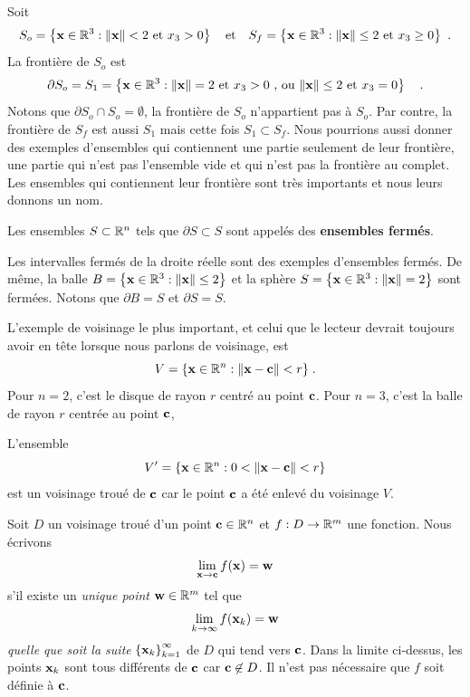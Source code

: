 {\begin{egg}[\theory]
Soit
\[
S_o = \left\{ \mathbf{x} \in \mathbb{R}^3 : \| \mathbf{x} \| < 2 \ \text{et} \
x_3> 0 \right\}
\quad \text{et} \quad
S_f = \left\{ \mathbf{x} \in \mathbb{R}^3 : \| \mathbf{x} \| \leq 2 \ \text{et}
\ x_3 \geq 0 \right\} \ .
\]
La frontière de $S_o$ est
\[
\partial S_o = S_1 = \left\{ \mathbf{x} \in \mathbb{R}^3 : \| \mathbf{x} \| = 2
\ \text{et} \ x_3 >0 \ \text{, ou}\ \|\mathbf{x}\| \leq 2
\ \text{et} \ x_3=0 \right\} \quad  .
\]
Notons que $\partial S_o \cap S_o = \emptyset$, la frontière de $S_o$
n'appartient pas à $S_o$.  Par contre, la frontière de $S_f$ est aussi
$S_1$ mais cette fois $S_1 \subset S_f$.  Nous pourrions aussi donner des
exemples d'ensembles qui contiennent une partie seulement de leur
frontière, une partie qui n'est pas l'ensemble vide et qui n'est pas
la frontière au complet.  Les ensembles qui contiennent leur frontière
sont très importants et nous leurs donnons un nom.
\end{egg}

\begin{defn}[+\theory]
Les ensembles $S \subset \mathbb{R}^n$ tels que $\partial S \subset S$ sont
appelés des {\bfseries ensembles fermés}\index{Ensemble fermé}.
\end{defn}

\begin{rmk}[\theory]
Les intervalles fermés de la droite réelle sont des exemples
d'ensembles fermés.  De même, la balle
$B = \left\{ \mathbf{x} \in \mathbb{R}^3 : \|\mathbf{x}\|\leq 2 \right\}$ et la
sphère $S = \left\{ \mathbf{x} \in \mathbb{R}^3 : \|\mathbf{x}\| =  2 \right\}$
sont fermées.  Notons que $\partial B = S$ et $\partial S = S$.
\end{rmk}

\begin{egg}
L'exemple de voisinage le plus important, et celui que le lecteur
devrait toujours avoir en tête lorsque nous parlons de voisinage, est
\[
V = \{ \mathbf{x} \in \mathbb{R}^n : \|\mathbf{x} - \mathbf{c}\| < r \} \; .
\]
Pour $n=2$, c'est le disque de rayon $r$ centré au point $\mathbf{c}$.
Pour $n=3$, c'est la balle de rayon $r$ centrée au point $\mathbf{c}$,

L'ensemble
\[
V' = \{ \mathbf{x} \in \mathbb{R}^n : 0< \|\mathbf{x} - \mathbf{c}\| < r \}
\]
est un voisinage troué de $\mathbf{c}$ car le point $\mathbf{c}$ a été
enlevé du voisinage $V$. 
\end{egg}

\begin{defn} 
Soit $D$ un voisinage troué d'un point $\mathbf{c} \in \mathbb{R}^n$ et
$f:D\rightarrow \mathbb{R}^m$ une fonction.  Nous écrivons
\[
\lim_{\mathbf{x}\rightarrow \mathbf{c}} f(\mathbf{x}) = \mathbf{w}
\]
s'il existe un {\em unique point} $\mathbf{w} \in \mathbb{R}^m$ tel que
\[
\lim_{k\rightarrow \infty} f(\mathbf{x}_k) = \mathbf{w}
\]
{\em quelle que soit la suite} 
$\displaystyle \left\{\mathbf{x}_k\right\}_{k=1}^\infty$ de $D$ qui tend
vers $\mathbf{c}$.  Dans la limite ci-dessus, les points $\mathbf{x}_k$ sont
tous différents de $\mathbf{c}$ car $\mathbf{c}\not\in D$.  Il
n'est pas nécessaire que $f$ soit définie à $\mathbf{c}$.


\end{defn}}
